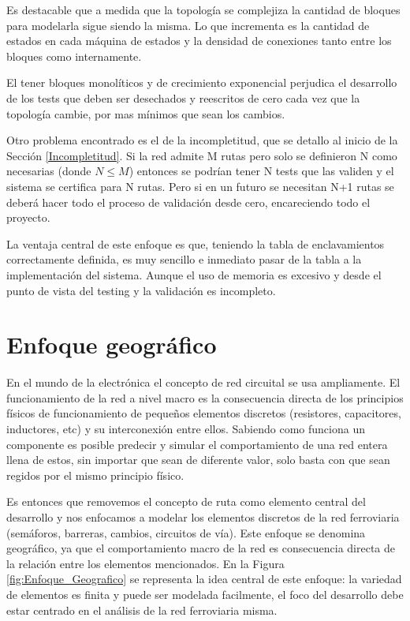 	Es destacable que a medida que la topología se complejiza la cantidad de bloques para modelarla sigue siendo la misma. Lo que incrementa es la cantidad de estados en cada máquina de estados y la densidad de conexiones tanto entre los bloques como internamente.
	
	El tener bloques monolíticos y de crecimiento exponencial perjudica el desarrollo de los tests que deben ser desechados y reescritos de cero cada vez que la topología cambie, por mas mínimos que sean los cambios. 
	
	Otro problema encontrado es el de la incompletitud, que se detallo al inicio de la Sección \ref{Incompletitud}. Si la red admite M rutas pero solo se definieron N como necesarias (donde $N \leq M$) entonces se podrían tener N tests que las validen y el sistema se certifica para N rutas. Pero si en un futuro se necesitan N+1 rutas se deberá hacer todo el proceso de validación desde cero, encareciendo todo el proyecto.
			
	La ventaja central de este enfoque es que, teniendo la tabla de enclavamientos correctamente definida, es muy sencillo e inmediato pasar de la tabla a la implementación del sistema. Aunque el uso de memoria es excesivo y desde el punto de vista del testing y la validación es incompleto.			
					
\section{Enfoque geográfico}

	En el mundo de la electrónica el concepto de red circuital se usa ampliamente. El funcionamiento de la red a nivel macro es la consecuencia directa de los principios físicos de funcionamiento de pequeños elementos discretos (resistores, capacitores, inductores, etc) y su interconexión entre ellos. Sabiendo como funciona un componente es posible predecir y simular el comportamiento de una red entera llena de estos, sin importar que sean de diferente valor, solo basta con que sean regidos por el mismo principio físico.
	
	Es entonces que removemos el concepto de ruta como elemento central del desarrollo y nos enfocamos a modelar los elementos discretos de la red ferroviaria (semáforos, barreras, cambios, circuitos de vía). Este enfoque se denomina geográfico, ya que el comportamiento macro de la red es consecuencia directa de la relación entre los elementos mencionados. En la Figura \ref{fig:Enfoque_Geografico} se representa la idea central de este enfoque: la variedad de elementos es finita y puede ser modelada facilmente, el foco del desarrollo debe estar centrado en el análisis de la red ferroviaria misma.
	
